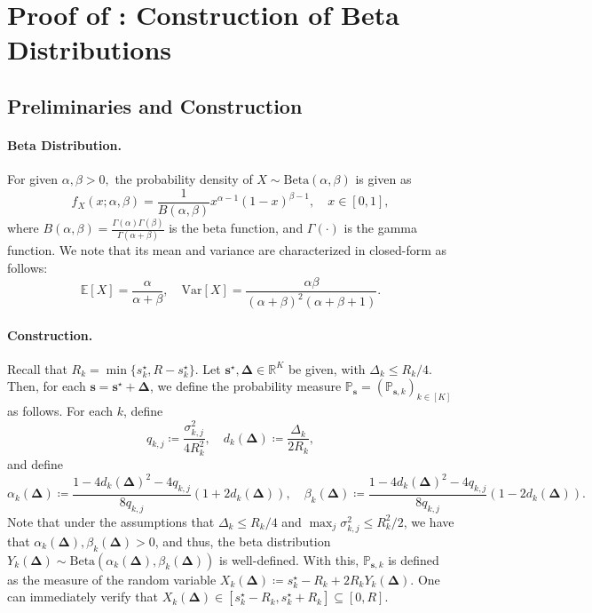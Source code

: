 \documentclass{article}
\newcommand{\Beta}{\mathrm{Beta}}
\def\vs{{\bm{s}}}
\def\sP{{\mathbb{P}}}
\def\sR{{\mathbb{R}}}
\newcommand{\E}{\mathbb{E}}
\newcommand{\Var}{\mathrm{Var}}
\theoremstyle{plain}
\theoremstyle{definition}
\theoremstyle{plain}
\begin{document}
\newpage
\section{\texorpdfstring{Proof of : Construction of Beta Distributions}{Proof of Proposition C.1: Construction of Beta Distributions}}
\label{app:beta-construction}

\subsection{Preliminaries and Construction}
\paragraph{Beta Distribution.} For given $\alpha, \beta > 0,$ the probability density of $X \sim \Beta(\alpha, \beta)$ is given as
\begin{equation}
    f_X(x; \alpha, \beta) = \frac{1}{B(\alpha, \beta)} x^{\alpha - 1} (1 - x)^{\beta - 1}, \quad x \in [0, 1],
\end{equation}
where $B(\alpha, \beta) = \frac{\Gamma(\alpha) \Gamma(\beta)}{\Gamma(\alpha + \beta)}$ is the beta function, and $\Gamma(\cdot)$ is the gamma function.
We note that its mean and variance are characterized in closed-form as follows:
\begin{equation}
    \E[X] = \frac{\alpha}{\alpha + \beta}, \quad \Var[X] = \frac{\alpha \beta}{(\alpha + \beta)^2 (\alpha + \beta + 1)}.
\end{equation}

\paragraph{Construction.}
Recall that $R_k = \min\{s_k^\star, R - s_k^\star\}$.
Let $\vs^\star, \bm\Delta \in \sR^K$ be given, with $\Delta_k \leq R_k / 4$.
Then, for each $\vs = \vs^\star + \bm\Delta$, we define the probability measure $\sP_{\vs} = (\sP_{\vs,k})_{k \in [K]}$ as follows.
For each $k$, define
\begin{equation}
    q_{k,j} \coloneq \frac{\sigma_{k,j}^2}{4 R_k^2}, \quad d_k(\bm\Delta) \coloneq \frac{\Delta_k}{2 R_k},
\end{equation}
and define
\begin{equation}
    \alpha_k(\bm\Delta) \coloneq \frac{1 - 4 d_k(\bm\Delta)^2 - 4 q_{k,j}}{8 q_{k,j}} (1 + 2d_k(\bm\Delta)), \quad
    \beta_k(\bm\Delta) \coloneq \frac{1 - 4 d_k(\bm\Delta)^2 - 4 q_{k,j}}{8 q_{k,j}} (1 - 2d_k(\bm\Delta)).
\end{equation}
Note that under the assumptions that $\Delta_k \leq R_k / 4$ and $\max_j \sigma_{k,j}^2 \leq R_k^2 / 2$, we have that $\alpha_k(\bm\Delta), \beta_k(\bm\Delta) > 0$, and thus, the beta distribution $Y_k(\bm\Delta) \sim \Beta(\alpha_k(\bm\Delta), \beta_k(\bm\Delta))$ is well-defined.
With this, $\sP_{\vs,k}$ is defined as the measure of the random variable $X_k(\bm\Delta) \coloneq s_k^\star - R_k + 2 R_k Y_k(\bm\Delta)$.
One can immediately verify that $X_k(\bm\Delta) \in [s_k^\star - R_k, s_k^\star + R_k] \subseteq [0, R].$
\end{document}
